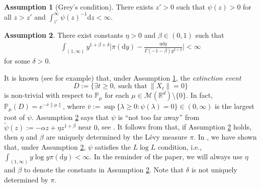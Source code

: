 \documentclass[12pt,a4paper]{amsart}
\theoremstyle{plain}
\theoremstyle{definition}
\newtheorem{asp}{Assumption}
\numberwithin{equation}{section}
\begin{document}
\begin{asp}[Grey's condition]
	\label{asp: Greys condition}
	There exists $z' > 0$ such that $\psi(z) > 0$ for all $z>z'$ and  $\int_{z'}^\infty \psi(z)^{-1} \mathrm dz < \infty$.
\end{asp}

\begin{asp}
	\label{asp: branching mechanism}
  There exist constants $\eta > 0$ and $\beta \in (0,1)$ such that
  \begin{align}
    \int_{(1,\infty)}y^{1+\beta +\delta}\Big|\pi(\mathrm dy)-\frac{\eta \mathrm dy}{\Gamma(-1-\beta)y^{2+\beta}}\Big| <\infty
  \end{align}
for some $\delta > 0$.
\end{asp}

It is known (see \cite[Theorems 12.5 \& 12.7]{Kyprianou2014Fluctuations} for example) that, under Assumption \ref{asp: Greys condition}, the \emph{extinction event}
$$D :=\{\exists t\geq 0,~\text{such that}~ \|X_t\| =0 \}$$
is non-trivial with respect to $\mathbb P_\mu$ for each  $\mu \in \mathcal M(\mathbb R^d)\setminus\{0\}$.
In fact, $ \mathbb{P}_{\mu} (D) = e^{-\bar v \|\mu\|}$, where $ \bar v := \sup\{\lambda \geq 0: \psi(\lambda) = 0\} \in (0,\infty) $ is the largest root of $\psi$.
Assumption \ref{asp: branching mechanism} says that $\psi$ is ``not too far away'' from $\widetilde \psi(z) := - \alpha z + \eta z^{1+\beta}$ near $0$, see \cite[Remark 1.3]{RenSongSunZhao2019Stable}.
It follows from \cite[Lemma 2.2]{RenSongSunZhao2019Stable}  that, if Assumption \ref{asp: branching mechanism} holds, then $\eta$ and $\beta$ are uniquely determined by the L\'evy measure $\pi$.
In \cite[Lemma 2.3]{RenSongSunZhao2019Stable}, we have shown  that,
under Assumption \ref{asp: branching mechanism},
 $\psi$ satisfies the $L \log L$ condition, i.e., $ \int_{(1,\infty)} y\log y \pi(\mathrm dy) < \infty. $
In the reminder of the paper, we will always use $\eta$ and $\beta$ to denote the constants in Assumption  \ref{asp: branching mechanism}.
	Note that $\delta$ is not uniquely determined by $\pi$.
\end{document}
